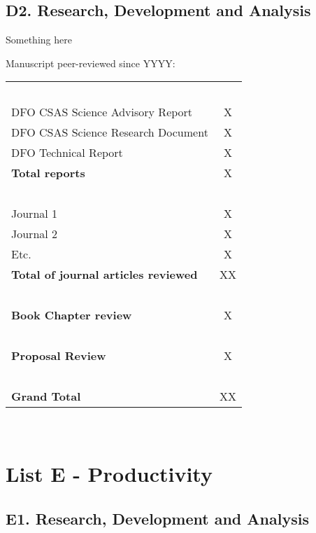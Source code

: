 \documentclass[11pt,letterpaper,roman]{article}
\newcounter{qcounter}
\begin{document}
\subsection*{D2. Research, Development and Analysis}
\begin{list}{D2.:~}{}

\item Something here

\item Manuscript peer-reviewed since YYYY:\\
  \begin{tabular}{l  c }
    ~&~ \\
    DFO CSAS Science Advisory Report & X\\
    DFO CSAS Science Research Document & X\\
    DFO Technical Report & X\\
    \bf{Total reports} & X\\
    ~&~ \\
    Journal 1 & X\\
    Journal 2 & X\\
    Etc. & X\\
    \bf{Total of journal articles reviewed} & XX\\
    ~&~ \\
    \bf{Book Chapter review} & X\\
    ~&~ \\
    \bf{Proposal Review} & X\\
    ~&~ \\
    \bf{Grand Total} & XX\\
   \end{tabular}\\

\end{list}


\section*{List E - Productivity}
\subsection*{E1. Research, Development and Analysis}
\end{document}
